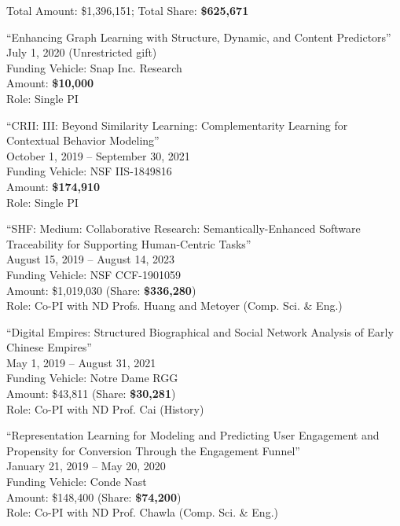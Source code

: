 \documentclass[10pt]{article}
\newenvironment{myindentpar}[1]%
{\begin{list}{}%
         {\setlength{\leftmargin}{#1}}%
         \item[]%
}
{\end{list}}
\newcounter{list}
\begin{document}
\begin{myindentpar}{0.75cm}

\hspace{-0.75cm} Total Amount: \$1,396,151; Total Share: \textbf{\$625,671}

\hspace{-0.75cm}``Enhancing Graph Learning with Structure, Dynamic, and Content Predictors''\\
July 1, 2020 (Unrestricted gift) \\
Funding Vehicle: Snap Inc. Research\\
Amount: \textbf{\$10,000} \\
Role: {Single PI}

\hspace{-0.75cm}``CRII: III: Beyond Similarity Learning: Complementarity Learning for Contextual Behavior Modeling''\\
October 1, 2019 -- September 30, 2021 \\
Funding Vehicle: NSF IIS-1849816 \\
Amount: \textbf{\$174,910} \\
Role: {Single PI}

\hspace{-0.75cm}``SHF: Medium: Collaborative Research: Semantically-Enhanced Software Traceability for Supporting Human-Centric Tasks''\\
August 15, 2019 -- August 14, 2023 \\
Funding Vehicle: NSF CCF-1901059 \\
Amount: \$1,019,030 (Share: \textbf{\$336,280}) \\
Role: {Co-PI} with ND Profs. Huang and Metoyer (Comp. Sci. \& Eng.)

\hspace{-0.75cm}``Digital Empires: Structured Biographical and Social Network Analysis of Early Chinese Empires''\\
May 1, 2019 -- August 31, 2021 \\
Funding Vehicle: Notre Dame RGG \\
Amount: \$43,811 (Share: \textbf{\$30,281}) \\
Role: {Co-PI} with ND Prof. Cai (History)

\hspace{-0.75cm}``Representation Learning for Modeling and Predicting User Engagement and Propensity for Conversion Through the Engagement Funnel''\\
January 21, 2019 -- May 20, 2020 \\
Funding Vehicle: Conde Nast \\
Amount: \$148,400 (Share: \textbf{\$74,200}) \\
Role: {Co-PI} with ND Prof. Chawla (Comp. Sci. \& Eng.)

\end{myindentpar}
\end{document}
